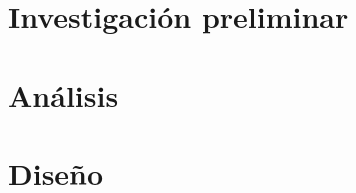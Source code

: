 \documentclass[a4paper,12pt]{scrbook}
\begin{document}
\chapter{Investigación preliminar}


\chapter{Análisis}


\chapter{Diseño}


% 

% 

% 


% 

% 

% 
\end{document}
